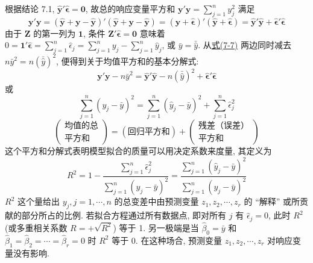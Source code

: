 根据结论 7.1, $\hat{\mathbf{y}}'\hat{\boldsymbol{\epsilon}}=\mathbf{0}$, 故总的响应变量平方和 $\mathbf{y}'\mathbf{y}=\sum\limits_{j=1}^{n}y_j^2$ 满足
\label{eq:7-7}
\begin{equation}
\mathbf{y}'\mathbf{y}=(\hat{\mathbf{y}}+\mathbf{y}-\hat{\mathbf{y}})'(\hat{\mathbf{y}}+\mathbf{y}-\hat{\mathbf{y}})
=(\hat{\mathbf{y}}+\hat{\boldsymbol{\epsilon}})'(\hat{\mathbf{y}}+\hat{\boldsymbol{\epsilon}})
=\hat{\mathbf{y}}'\hat{\mathbf{y}}+\hat{\boldsymbol{\epsilon}}'\hat{\boldsymbol{\epsilon}}
\tag{7-7}
\end{equation}
由于 $\mathbf{Z}$ 的第一列为 $\mathbf{1}$, 条件 $\mathbf{Z}'\hat{\boldsymbol{\epsilon}}=\mathbf{0}$ 意味着 $0=\mathbf{1}'\hat{\boldsymbol{\epsilon}}=\sum\limits_{j=1}^{n}\hat{\epsilon}_j=\sum\limits_{j=1}^{n}y_j-\sum\limits_{j=1}^{n}\hat{y}_j$, 或 $\bar{y}=\bar{\hat{y}}$. 从\hyperref[eq:7-7]{式(7-7)} 两边同时减去 $n\bar{y}^2=n(\bar{\hat{y}})^2$, 便得到关于均值平方和的基本分解式:
\[
\mathbf{y}'\mathbf{y}-n\bar{y}^2=\hat{\mathbf{y}}'\hat{\mathbf{y}}-n(\bar{\hat{y}})^2+\hat{\boldsymbol{\epsilon}}'\hat{\boldsymbol{\epsilon}}
\]
或
\label{eq:7-8}
\begin{equation}
\sum_{j=1}^{n}(y_j-\bar{y})^2=\sum_{j=1}^{n}(\hat{y}_j-\bar{y})^2+\sum_{j=1}^{n}\hat{\epsilon}_j^2
\tag{7-8}
\end{equation}
\[
\left(\begin{array}{c}\text{均值的总}\\\text{平方和}\end{array}\right)
=(\text{回归平方和})+\left(\begin{array}{c}\text{残差（误差）}\\\text{平方和}\end{array}\right)
\]
这个平方和分解式表明模型拟合的质量可以用决定系数来度量, 其定义为
\label{eq:7-9}
\begin{equation}
R^2=1-\frac{\sum\limits_{j=1}^{n}\hat{\epsilon}_j^2}{\sum\limits_{j=1}^{n}(y_j-\bar{y})^2}
=\frac{\sum\limits_{j=1}^{n}(\hat{y}_j-\bar{y})^2}{\sum\limits_{j=1}^{n}(y_j-\bar{y})^2}
\tag{7-9}
\end{equation}
$R^2$ 这个量给出 $y_j,j=1,\cdots,n$ 的总变差中由预测变量 $z_1,z_2,\cdots,z_r$ 的 ``解释'' 或所贡献的部分所占的比例. 若拟合方程通过所有数据点, 即对所有 $j$ 有 $\hat{\epsilon}_j=0$, 此时 $R^2$(或多重相关系数 $R=+\sqrt{R^2}$) 等于 1. 另一极端是当 $\hat{\beta}_0=\bar{y}$ 和 $\hat{\beta}_1=\hat{\beta}_2=\cdots=\hat{\beta}_r=0$ 时 $R^2$ 等于 0. 在这种场合, 预测变量 $z_1,z_2,\cdots,z_r$ 对响应变量没有影响.

